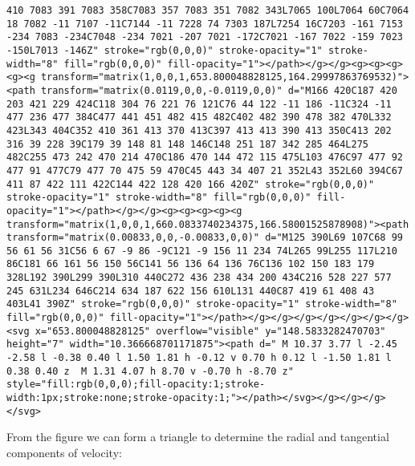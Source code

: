 \documentclass[
]{article}
\begin{document}
\begin{verbatim}
410 7083 391 7083 358C7083 357 7083 351 7082 343L7065 100L7064 60C7064 18 7082 -11 7107 -11C7144 -11 7228 74 7303 187L7254 16C7203 -161 7153 -234 7083 -234C7048 -234 7021 -207 7021 -172C7021 -167 7022 -159 7023 -150L7013 -146Z" stroke="rgb(0,0,0)" stroke-opacity="1" stroke-width="8" fill="rgb(0,0,0)" fill-opacity="1"></path></g></g><g><g><g><g><g transform="matrix(1,0,0,1,653.800048828125,164.29997863769532)"><path transform="matrix(0.0119,0,0,-0.0119,0,0)" d="M166 420C187 420 203 421 229 424C118 304 76 221 76 121C76 44 122 -11 186 -11C324 -11 477 236 477 384C477 441 451 482 415 482C402 482 390 478 382 470L332 423L343 404C352 410 361 413 370 413C397 413 413 390 413 350C413 202 316 39 228 39C179 39 148 81 148 146C148 251 187 342 285 464L275 482C255 473 242 470 214 470C186 470 144 472 115 475L103 476C97 477 92 477 91 477C79 477 70 475 59 470C45 443 34 407 21 352L43 352L60 394C67 411 87 422 111 422C144 422 128 420 166 420Z" stroke="rgb(0,0,0)" stroke-opacity="1" stroke-width="8" fill="rgb(0,0,0)" fill-opacity="1"></path></g></g><g><g><g><g><g transform="matrix(1,0,0,1,660.0833740234375,166.58001525878908)"><path transform="matrix(0.00833,0,0,-0.00833,0,0)" d="M125 390L69 107C68 99 56 61 56 31C56 6 67 -9 86 -9C121 -9 156 11 234 74L265 99L255 117L210 86C181 66 161 56 150 56C141 56 136 64 136 76C136 102 150 183 179 328L192 390L299 390L310 440C272 436 238 434 200 434C216 528 227 577 245 631L234 646C214 634 187 622 156 610L131 440C87 419 61 408 43 403L41 390Z" stroke="rgb(0,0,0)" stroke-opacity="1" stroke-width="8" fill="rgb(0,0,0)" fill-opacity="1"></path></g></g></g></g></g></g></g><svg x="653.800048828125" overflow="visible" y="148.5833282470703" height="7" width="10.366668701171875"><path d=" M 10.37 3.77 l -2.45 -2.58 l -0.38 0.40 l 1.50 1.81 h -0.12 v 0.70 h 0.12 l -1.50 1.81 l 0.38 0.40 z  M 1.31 4.07 h 8.70 v -0.70 h -8.70 z" style="fill:rgb(0,0,0);fill-opacity:1;stroke-width:1px;stroke:none;stroke-opacity:1;"></path></svg></g></g></g></svg>
\end{verbatim}

From the figure we can form a triangle to determine the radial and
tangential components of velocity:
\end{document}
